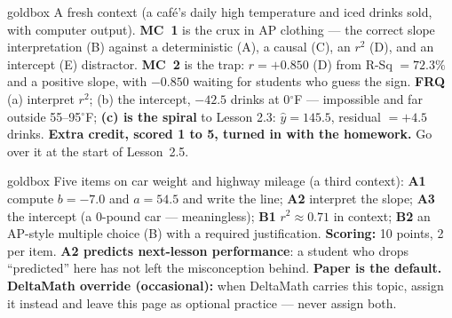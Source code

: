 \documentclass[10pt]{article}
\begin{document}
\boxguard
\begin{skillbox}{goldbox}
A fresh context (a caf\'e's daily high temperature and iced drinks sold, with computer output).
\textbf{MC~1} is the crux in AP clothing --- the correct slope interpretation (B) against a
deterministic (A), a causal (C), an $r^2$ (D), and an intercept (E) distractor. \textbf{MC~2}
is the trap: $r = +0.850$ (D) from R-Sq $= 72.3\%$ and a positive slope, with $-0.850$ waiting
for students who guess the sign. \textbf{FRQ} (a) interpret $r^2$; (b) the intercept,
$-42.5$ drinks at 0$^\circ$F --- impossible and far outside 55--95$^\circ$F; \textbf{(c) is the
spiral} to Lesson 2.3: $\hat y = 145.5$, residual $= +4.5$ drinks. \textbf{Extra credit, scored 1 to 5, turned in with the homework.} Go over it at the start of Lesson~2.5.
\end{skillbox}

\boxguard
\begin{skillbox}{goldbox}
Five items on car weight and highway mileage (a third context): \textbf{A1} compute $b = -7.0$
and $a = 54.5$ and write the line; \textbf{A2} interpret the slope; \textbf{A3} the intercept
(a 0-pound car --- meaningless); \textbf{B1} $r^2 \approx 0.71$ in context; \textbf{B2} an
AP-style multiple choice (B) with a required justification. \textbf{Scoring:} 10 points, 2 per
item. \textbf{A2 predicts next-lesson performance}: a student who drops ``predicted'' here has
not left the misconception behind. \textbf{Paper is the default.} \textbf{DeltaMath override
(occasional):} when DeltaMath carries this topic, assign it instead and leave this page as optional practice --- never assign both.
\end{skillbox}
\end{document}
